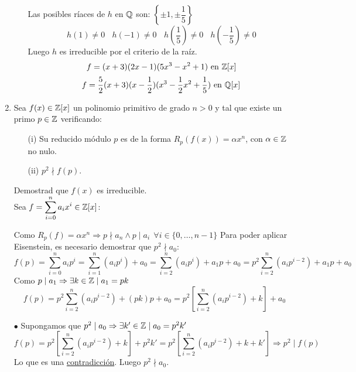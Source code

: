 \documentclass[12pt]{article}
\newcounter{ejercicio}[section] %
\newcounter{ejercicio}
\begin{document}
\begin{ejercicio}[3.5 puntos]
\begin{enumerate}
\begin{enumerate}
                    \noindent
                    Las posibles ríaces de $h$ en $\mathbb{Q}$ son: $\left\{ \pm 1, \pm \dfrac{1}{5} \right\}$
                    $$h(1) \neq 0~~~~h(-1)\neq 0~~~~h\left(\dfrac{1}{5}\right) \neq 0 ~~~~h\left(-\dfrac{1}{5}\right) \neq 0$$
                    Luego $h$ es irreducible por el criterio de la raíz.\\
                    $$f = (x+3)(2x-1)(5x^3-x^2+1) \mbox{ en } \mathbb{Z}[x]$$
                    $$f = \dfrac{5}{2}(x+3)(x-\dfrac{1}{2})(x^3-\dfrac{1}{2}x^2+\dfrac{1}{5}) \mbox{ en } \mathbb{Q}[x]$$

                    


            \end{enumerate}
            \item Sea $f(x) \in \mathbb{Z}[x]$ un polinomio primitivo de grado $n>0$ y tal que existe un primo $p \in \mathbb{Z}$ verificando:
                \begin{enumerate}
                    \item[(i)] Su reducido módulo $p$ es de la forma $R_p(f(x)) = \alpha x^n$, con $\alpha \in \mathbb{Z}$ no nulo.
                    \item[(ii)] $p^2 \nmid f(p)$. 
                \end{enumerate}
                Demostrad que $f(x)$ es irreducible.\\

                \noindent
                Sea $f = \displaystyle\sum_{i=0}^n a_i x^i \in \mathbb{Z}[x]$:

                \noindent
                Como $R_p(f) = \alpha x^n \Rightarrow p \nmid a_n \land p \mid a_i~~\forall i \in \{0, \ldots, n-1\}$\newline
                Para poder aplicar Eisenstein, es necesario demostrar que $p^2 \nmid a_0$:\\

                \noindent
                $$f(p) = \displaystyle \sum_{i=0}^n a_i p^i = \sum_{i=1}^n (a_i p^i) + a_0 = \sum_{i=2}^n (a_i p^i) + a_1 p + a_0 = p^2 \sum_{i=2}^n (a_i p^{i-2}) + a_1 p + a_0$$
                Como $p\mid a_1\Rightarrow \exists k \in \mathbb{Z} \mid a_1 = pk$
                $$f(p) = p^2 \displaystyle\sum_{i=2}^n (a_i p^{i-2}) + (pk)p+a_0 = p^2 \left[\sum_{i=2}^n (a_i p^{i-2}) + k \right] + a_0$$

                \noindent
                $\bullet$ Supongamos que $p^2 \mid a_0 \Rightarrow \exists k' \in \mathbb{Z} \mid a_0 = p^2 k'$ 
            $$f(p) = p^2 \left[\sum_{i=2}^n(a_ip^{i-2})+k\right] + p^2 k' = p^2 \left[\sum_{i=2}^n (a_i p^{i-2})+k+k'\right] \Rightarrow p^2 \mid f(p)$$
            Lo que es una \underline{contradicción}. Luego $p^2 \nmid a_0$.\\


\end{enumerate}
\end{ejercicio}
\end{document}
